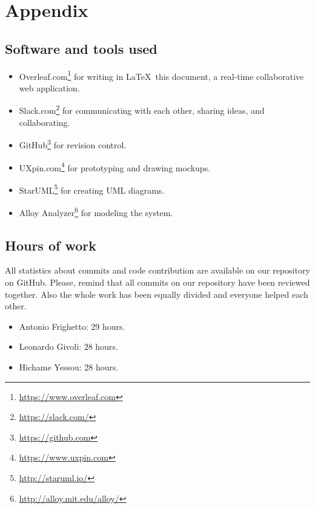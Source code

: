 \chapter*{Appendix}

\section*{Software and tools used}
\begin{itemize}
\item Overleaf.com\footnote{\url{https://www.overleaf.com}} for writing in \LaTeX\ this document, a real-time collaborative web application.
\item Slack.com\footnote{\url{https://slack.com/}} for communicating with each other, sharing ideas, and collaborating.
\item GitHub\footnote{\url{https://github.com}} for revision control.
\item UXpin.com\footnote{\url{https://www.uxpin.com}} for prototyping and drawing mockups.
\item StarUML\footnote{\url{http://staruml.io/}} for creating UML diagrams.
\item Alloy Analyzer\footnote{\url{http://alloy.mit.edu/alloy/}} for modeling the system.
\end{itemize}

\section*{Hours of work}
All statistics about commits and code contribution are available on our repository on GitHub. Please, remind that all commits on our repository have been reviewed together. Also the whole work has been equally divided and everyone helped each other.

\begin{itemize}
    \item Antonio Frighetto: 29 hours.
    \item Leonardo Givoli: 28 hours.
    \item Hichame Yessou: 28 hours.
\end{itemize}